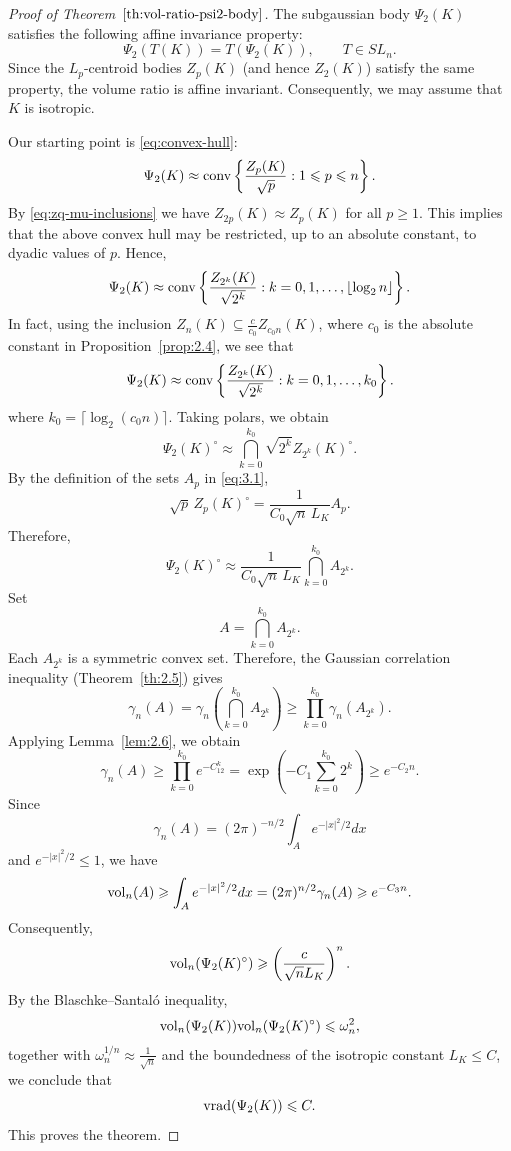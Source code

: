 \documentclass[11pt,leqno]{article}
\theoremstyle{definition}
\numberwithin{equation}{section}
\newcommand{\ls}{\leqslant}
\newcommand{\gr}{\geqslant}
\begin{document}
\begin{proof}[Proof of Theorem~$\ref{th:vol-ratio-psi2-body}$]
The subgaussian body $\Psi_2(K)$ satisfies the following affine invariance property: 
\[\Psi_2(T(K))=T(\Psi_2(K)),\qquad T\in SL_n.\]
Since the $L_p$-centroid bodies $Z_p(K)$ (and hence $Z_2(K)$) satisfy the same property, the volume ratio is affine invariant.
Consequently, we may assume that $K$ is isotropic.

Our starting point is \eqref{eq:convex-hull}:
\begin{equation*}\Psi_2(K )\approx {\rm conv}\left\{\frac{Z_p(K)}{\sqrt{p}}: 1\ls p\ls n\right\}.\end{equation*} 
By \eqref{eq:zq-mu-inclusions} we have $Z_{2p}(K )\approx Z_{p}(K)$ for all $p\gr 1$. This implies that the above
convex hull may be restricted, up to an absolute constant, to dyadic values
of $p$. Hence,
\begin{equation*}\Psi_2(K)\approx {\rm conv} \left\{\frac{Z_{2^k}(K )}{\sqrt{2^k}}: k=0,1,\ldots ,\lfloor\log_{2}n\rfloor \right\}. \end{equation*}
In fact, using the inclusion $Z_n(K)\subseteq \frac{c}{c_0}Z_{c_0n}(K)$, where $c_0$ is the absolute constant in Proposition~\ref{prop:2.4}, we see that
\begin{equation*}\Psi_2(K)\approx {\rm conv} \left\{\frac{Z_{2^k}(K )}{\sqrt{2^k}}: k=0,1,\ldots ,k_0 \right\}. \end{equation*}
where $k_0=\lceil \log_2(c_0n)\rceil$. Taking polars, we obtain
\[\Psi_2(K )^{\circ}\approx \bigcap_{k=0}^{k_0}\sqrt{2^k}Z_{2^k}(K)^{\circ}.\]
By the definition of the sets $A_p$ in \eqref{eq:3.1},
\[\sqrt{p}\,Z_p(K)^\circ=\frac{1}{C_0\sqrt n\,L_K}A_p .\]
Therefore,
\[\Psi_2(K)^\circ\approx\frac{1}{C_0\sqrt n\,L_K}\bigcap_{k=0}^{k_0}A_{2^k}.\]
Set
\[A=\bigcap_{k=0}^{k_0}A_{2^k}.\]
Each $A_{2^k}$ is a symmetric convex set. Therefore, the Gaussian correlation inequality (Theorem~\ref{th:2.5}) gives 
\[\gamma_n(A)=\gamma_n\left(\bigcap_{k=0}^{k_0 } A_{2^k}\right)\gr\prod_{k=0}^{k_0} \gamma_n(A_{2^k}).\]
Applying Lemma~\ref{lem:2.6}, we obtain
\[\gamma_n(A)\gr\prod_{k=0}^{k_0} e^{-C_12^k}=
\exp\left(-C_1\sum_{k=0}^{k_0}2^k\right)\gr e^{-C_2n}.\]
Since
\[\gamma_n(A)=(2\pi)^{-n/2}\int_Ae^{-|x|^2/2}dx\]
and $e^{-|x|^2/2}\ls 1$, we have
\[{\rm vol}_n(A)\gr \int_Ae^{-|x|^2/2}dx= (2\pi)^{n/2}\gamma_n(A) \gr e^{-C_3n}.\]
Consequently,
\[{\rm vol}_n(\Psi_2(K )^{\circ})\gr \left(\frac{c}{\sqrt{n}L_K}\right)^n.\]
By the Blaschke--Santal\'{o} inequality,
\[{\rm vol}_n(\Psi_2(K)){\rm vol}_n(\Psi_2(K )^{\circ})\ls\omega_n^2,\]
together with $\omega_n^{1/n}\approx\frac{1}{\sqrt{n}}$ and the boundedness of the isotropic constant $L_K\ls C$, we conclude that
\[{\rm vrad}(\Psi_2(K))\ls C.\]
This proves the theorem.
\end{proof}
\end{document}
